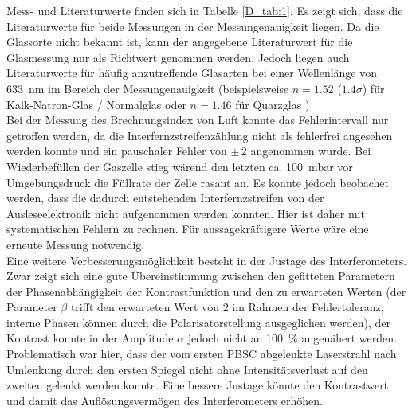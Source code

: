 Mess- und Literaturwerte finden sich in Tabelle \ref{D_tab:1}. Es zeigt sich, dass
die Literaturwerte für beide Messungen in der Messungenauigkeit liegen. Da die Glassorte
nicht bekannt ist, kann der angegebene Literaturwert für die Glasmessung nur als
Richtwert genommen werden. Jedoch liegen auch Literaturwerte für häufig anzutreffende
Glasarten bei einer Wellenlänge von \SI{633}{\nano\metre} im Bereich der Messungenauigkeit
(beispielsweise $n=\num{1.52}$ ($\num{1.4}\sigma$) für Kalk-Natron-Glas / Normalglas \cite{KNG} oder
$n=\num{1.46}$ für Quarzglas \cite{QG})\\
Bei der Messung des Brechnungsindex von Luft konnte das Fehlerintervall nur getroffen
werden, da die Interfernzstreifenzählung nicht als fehlerfrei angesehen werden konnte
und ein pauschaler Fehler von $\pm \, 2$ angenommen wurde.
Bei Wiederbefüllen der Gaszelle stieg wärend
den letzten ca. \SI{100}{\milli\bar} vor Umgebungsdruck die Füllrate der Zelle rasant an.
Es konnte jedoch beobachet werden, dass die dadurch entstehenden Interfernzstreifen
von der Ausleseelektronik nicht aufgenommen werden konnten. Hier ist daher mit
systematischen Fehlern zu rechnen. Für aussagekräftigere Werte wäre eine erneute
Messung notwendig.\\
Eine weitere Verbesserungsmöglichkeit besteht in der Justage des Interferometers.
Zwar zeigt sich eine gute Übereinstimmung zwischen den gefitteten Parametern
der Phasenabhängigkeit der Kontrastfunktion und den zu erwarteten Werten (der
Parameter $\beta$ trifft den erwarteten Wert von $2$ im Rahmen der Fehlertoleranz,
interne Phasen können durch die Polarisatorstellung ausgeglichen werden),
der Kontrast konnte in der Amplitude $\alpha$ jedoch nicht an \SI{100}{\percent} angenähert werden.
Problematisch war hier, dass der vom ersten PBSC abgelenkte Laserstrahl nach Umlenkung
durch den ersten Spiegel nicht ohne Intensitätsverlust auf den zweiten gelenkt werden
konnte. Eine bessere Justage könnte den Kontrastwert und damit das Auflösungsvermögen
des Interferometers erhöhen.


\newpage
\nocite{*}
\printbibliography
